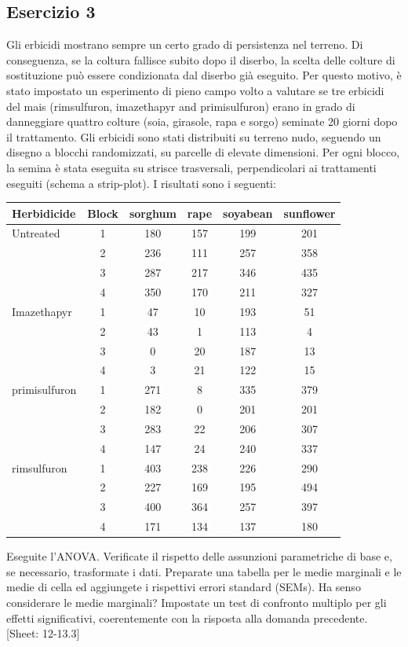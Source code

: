 \documentclass[a4paper,12pt,oneside]{book}
\begin{document}
\hypertarget{esercizio-3-7}{%
\subsection{Esercizio 3}\label{esercizio-3-7}}

Gli erbicidi mostrano sempre un certo grado di persistenza nel terreno. Di conseguenza, se la coltura fallisce subito dopo il diserbo, la scelta delle colture di sostituzione può essere condizionata dal diserbo già eseguito. Per questo motivo, è stato impostato un esperimento di pieno campo volto a valutare se tre erbicidi del mais (rimsulfuron, imazethapyr and primisulfuron) erano in grado di danneggiare quattro colture (soia, girasole, rapa e sorgo) seminate 20 giorni dopo il trattamento. Gli erbicidi sono stati distribuiti su terreno nudo, seguendo un disegno a blocchi randomizzati, su parcelle di elevate dimensioni. Per ogni blocco, la semina è stata eseguita su strisce trasversali, perpendicolari ai trattamenti eseguiti (schema a strip-plot). I risultati sono i seguenti:

\begin{longtable}[]{@{}lccccc@{}}
\toprule
Herbidicide & Block & sorghum & rape & soyabean & sunflower \\
\midrule
\endhead
Untreated & 1 & 180 & 157 & 199 & 201 \\
& 2 & 236 & 111 & 257 & 358 \\
& 3 & 287 & 217 & 346 & 435 \\
& 4 & 350 & 170 & 211 & 327 \\
Imazethapyr & 1 & 47 & 10 & 193 & 51 \\
& 2 & 43 & 1 & 113 & 4 \\
& 3 & 0 & 20 & 187 & 13 \\
& 4 & 3 & 21 & 122 & 15 \\
primisulfuron & 1 & 271 & 8 & 335 & 379 \\
& 2 & 182 & 0 & 201 & 201 \\
& 3 & 283 & 22 & 206 & 307 \\
& 4 & 147 & 24 & 240 & 337 \\
rimsulfuron & 1 & 403 & 238 & 226 & 290 \\
& 2 & 227 & 169 & 195 & 494 \\
& 3 & 400 & 364 & 257 & 397 \\
& 4 & 171 & 134 & 137 & 180 \\
\bottomrule
\end{longtable}

Eseguite l'ANOVA. Verificate il rispetto delle assunzioni parametriche di base e, se necessario, trasformate i dati. Preparate una tabella per le medie marginali e le medie di cella ed aggiungete i rispettivi errori standard (SEMs). Ha senso considerare le medie marginali? Impostate un test di confronto multiplo per gli effetti significativi, coerentemente con la risposta alla domanda precedente.
{[}Sheet: 12-13.3{]}
\end{document}
